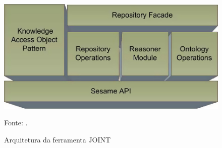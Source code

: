 \begin{figure}[!ht]
	\centering
	\includegraphics[width=1\textwidth]{./imagens/joint.png}
	\caption{Arquitetura da ferramenta JOINT}
	\footnotesize{Fonte: \cite{holanda2013joint}.}
	\label{fig:joint}
\end{figure}